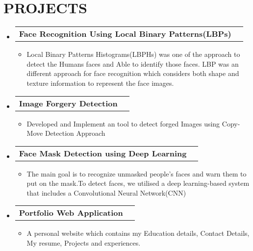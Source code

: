 \documentclass[letterpaper,11pt]{article}
\makeatletter
\newcommand{\resumeItem}[1]{
  \item\small{
    {#1 \vspace{-1pt}}
  }
}
\newcommand{\resumeProjectHeading}[2]{
    \item
    \begin{tabular*}{\textwidth}{l@{\extracolsep{\fill}}r}
      #1 & {\color{dark-grey}} \\
    \end{tabular*}\vspace{-4pt}
}
\newcommand{\resumeSubHeadingListStart}{\begin{itemize}[leftmargin=0in, label={}]}
\newcommand{\resumeSubHeadingListEnd}{\end{itemize}}
\newcommand{\resumeItemListStart}{\begin{itemize}}
\newcommand{\resumeItemListEnd}{\end{itemize}\vspace{0pt}}
\makeatother
\begin{document}

\section{PROJECTS}
    \resumeSubHeadingListStart
      \resumeProjectHeading
          {\textbf{Face Recognition Using Local Binary Patterns(LBPs)}} {}
          \resumeItemListStart
            \resumeItem{Local Binary Patterns Histograms(LBPHs) was one of the approach to detect the Humans faces and Able to identify those faces. LBP was an different approach for face recognition which considers both shape and texture information to represent the face images.}            
          \resumeItemListEnd
          
        \resumeProjectHeading
          {\textbf{Image Forgery Detection}}{}
          \resumeItemListStart
            \resumeItem{Developed and Implement an tool to detect forged Images using Copy-Move Detection Approach}         
          \resumeItemListEnd          
      \resumeProjectHeading
         {\textbf{Face Mask Detection using Deep Learning}}{}
          \resumeItemListStart
            \resumeItem{The main goal is to recognize unmasked people's faces and warn them to put on the mask.To detect faces, we utilised a deep learning-based system that includes a Convolutional Neural Network(CNN)}            
          \resumeItemListEnd

      \resumeProjectHeading
         {\textbf{Portfolio Web Application}}{}
          \resumeItemListStart
            \resumeItem{A personal website which  contains my Education details, Contact Details, My resume, Projects and experiences.}            
          \resumeItemListEnd                                
    \resumeSubHeadingListEnd




\end{document}
